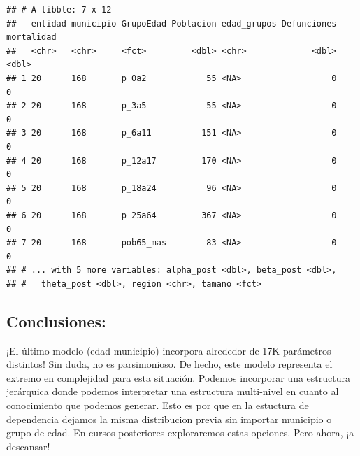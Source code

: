 \documentclass[
]{article}
\begin{document}
\begin{verbatim}
## # A tibble: 7 x 12
##   entidad municipio GrupoEdad Poblacion edad_grupos Defunciones mortalidad
##   <chr>   <chr>     <fct>         <dbl> <chr>             <dbl>      <dbl>
## 1 20      168       p_0a2            55 <NA>                  0          0
## 2 20      168       p_3a5            55 <NA>                  0          0
## 3 20      168       p_6a11          151 <NA>                  0          0
## 4 20      168       p_12a17         170 <NA>                  0          0
## 5 20      168       p_18a24          96 <NA>                  0          0
## 6 20      168       p_25a64         367 <NA>                  0          0
## 7 20      168       pob65_mas        83 <NA>                  0          0
## # ... with 5 more variables: alpha_post <dbl>, beta_post <dbl>,
## #   theta_post <dbl>, region <chr>, tamano <fct>
\end{verbatim}

\hypertarget{conclusiones}{%
\subsection{Conclusiones:}\label{conclusiones}}

¡El último modelo (edad-municipio) incorpora alrededor de 17K parámetros
distintos! Sin duda, no es parsimonioso. De hecho, este modelo
representa el extremo en complejidad para esta situación. Podemos
incorporar una estructura jerárquica donde podemos interpretar una
estructura multi-nivel en cuanto al conocimiento que podemos generar.
Esto es por que en la estuctura de dependencia dejamos la misma
distribucion previa sin importar municipio o grupo de edad. En cursos
posteriores exploraremos estas opciones. Pero ahora, ¡a descansar!
\end{document}
